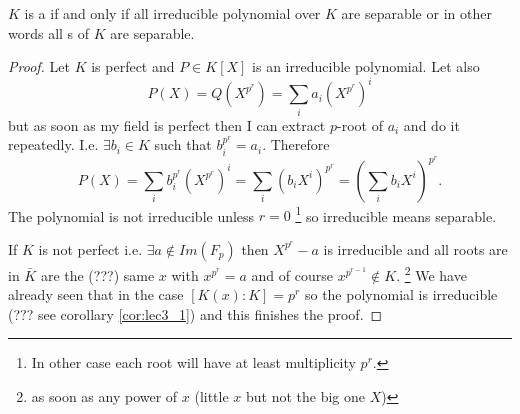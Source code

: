 \begin{theorem}
  $K$ is a  if and only if all irreducible
  polynomial over $K$ 
  are separable or in other words all
  s of $K$ are separable. 
  \begin{proof}
    Let $K$ is perfect and $P \in K\left[X\right]$ is an irreducible
    polynomial. Let also
    \[
    P\left(X\right) = Q\left(X^{p^r}\right) =
    \sum_i a_i \left(X^{p^r}\right)^i
    \]
    but as soon as my field is perfect then I can extract $p$-root of
    $a_i$ and do it repeatedly. I.e. $\exists b_i \in K$ such that
    $b_i^{p^r} = a_i$. Therefore
    \[
    P\left(X\right) =
    \sum_i b_i^{p^r} \left(X^{p^r}\right)^i =
    \sum_i \left(b_i X^i\right)^{p^r} =
    \left( \sum_i b_i X^i\right)^{p^r}.
    \]
    The polynomial is not irreducible unless $r=0$
    \footnote{
      In other case each root will have at least multiplicity $p^r$.
    } so irreducible means separable.

    If $K$ is not perfect i.e. $\exists a \notin Im\left(F_p\right)$ then
    $X^{p^r} - a$ is irreducible and all roots are in $\bar{K}$ are
    the (???)
    same $x$ with $x^{p^r} = a$ and of course
    $x^{p^{r-1}} \notin K$.
    \footnote{
      as soon as any power of $x$ (little $x$ but not the big one $X$)
      }
    We have already seen that in the case
    $\left[K\left(x\right): K\right] = p^r$ so the polynomial is
    irreducible (??? see corollary \ref{cor:lec3_1}) and this finishes
    the proof. 
  \end{proof}
  \label{thm:lec3_4}
\end{theorem}
